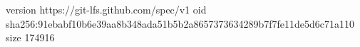 version https://git-lfs.github.com/spec/v1
oid sha256:91ebabf10b6e39aa8b348ada51b5b2a8657373634289b7f7fe11de5d6c71a110
size 174916
